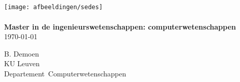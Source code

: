 \documentclass[11pt]{report}
\begin{document}
\renewcommand{\thepage}{}



\begin{center}
~~\\
~~\\
~~\\
~~\\
\texttt{[image: afbeeldingen/sedes]}
~~\\
~~\\
{\Large \bf Master in de ingenieurswetenschappen:
  computerwetenschappen}\\[0.5cm] \today

\vspace*{2cm}
{\large B. Demoen}\\
KU Leuven\\
Departement\ Computerwetenschappen 
\end{center}

\newpage


\setcounter{tocdepth}{1}
\tableofcontents
\setcounter{page}{1}
\renewcommand{\thepage}{\roman{page}}
\setcounter{tocdepth}{2}

\newpage


\renewcommand{\thepage}{\arabic{page}}
\setcounter{page}{1}
\setlength{\parskip}{0.2cm}




 






% 
\end{document}

